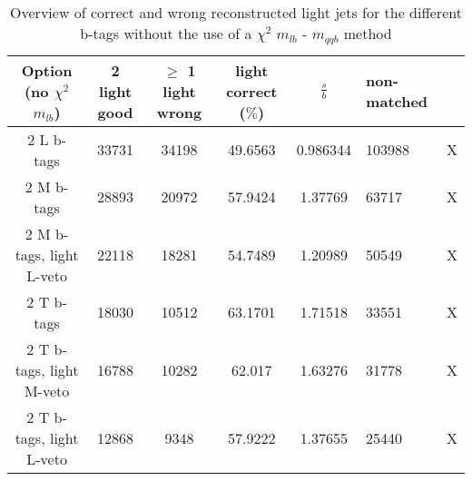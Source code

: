  \begin{table}[!h] 
 \begin{tabular}{c|c|c|c|c} 
\textbf{Option} (no $\chi^{2}$ $m_{lb}$) & 2 light good  & $\geq$ 1 light wrong & light correct ($\%$) & $\frac{s}{b}$ & non-matched \\  L b-tags              & 33731 & 34198 & 49.6563 & 0.986344 & 103988 & X \\ 
2 M b-tags              & 28893 & 20972 & 57.9424 & 1.37769 & 63717 & X \\ 
2 M b-tags, light L-veto & 22118 & 18281 & 54.7489 & 1.20989 & 50549 & X \\ 
2 T b-tags              & 18030 & 10512 & 63.1701 & 1.71518 & 33551 & X \\ 
2 T b-tags, light M-veto & 16788 & 10282 & 62.017 & 1.63276 & 31778 & X \\ 
2 T b-tags, light L-veto & 12868 & 9348 & 57.9222 & 1.37655 & 25440 & X \\ 
 \end{tabular} 
\caption{Overview of correct and wrong reconstructed light jets for the different b-tags without the use of a $\chi^{2}$ $m_{lb}$ - $m_{qqb}$ method} 
 \end{table} 
 
